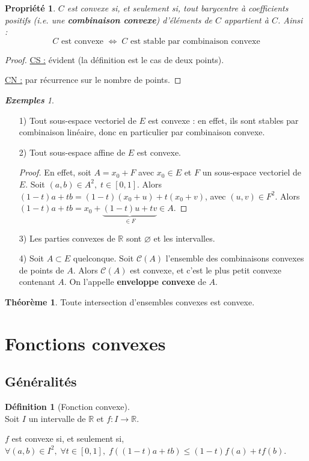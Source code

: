 \documentclass[12pt]{book}
\let\ensembleNombre\mathbb
\newcommand*\R{\ensuremath{\ensembleNombre{R}}}
\newtheorem*{prop}{Propriété}
\theoremstyle{definition}
\newtheorem*{defi}{Définition}
\newtheorem{thme}{Théorème}[chapter]
\theoremstyle{remark}
\newtheorem*{exs}{\textbf{Exemples}}
\newenvironment{fdef}
  {\begin{mdframed}[roundcorner=10pt, linewidth=1pt]\begin{defi}}
  {\end{defi}\end{mdframed}}
\newenvironment{fthme}
  {\begin{mdframed}[roundcorner=10pt, linewidth=2pt]\begin{thme}}
  {\end{thme}\end{mdframed}}
\begin{document}
	\begin{prop}
	$C$ est convexe si, et seulement si, tout barycentre à coefficients positifs (i.e. une \textbf{combinaison convexe}) d'éléments de $C$ appartient à $C$. Ainsi :
	\[ C \text{ est convexe } \Longleftrightarrow \;C \text{ est stable par combinaison convexe} \]
	\end{prop}
	\begin{proof}
	\underline{CS :} évident (la définition est le cas de deux points).
	
	\underline{CN :} par récurrence sur le nombre de points.
	\end{proof}
	
	\begin{exs}\mbox{~}\\
	\begin{itemize}
	\item[1)] Tout sous-espace vectoriel de $E$ est convexe : en effet, ils sont stables par combinaison linéaire, donc en particulier par combinaison convexe.
	\item[2)] Tout sous-espace affine de $E$ est convexe.
				\begin{proof}
				En effet, soit $A = x_0 + F$ avec $x_0 \in E$ et $F$ un sous-espace vectoriel de $E$. Soit $(a,b) \in A^2,\; t \in [0,1]$. Alors $(1-t)a + tb = (1-t)(x_0 + u) + t(x_0 + v)$, avec $(u,v) \in F^2$. Alors $(1-t)a + tb = x_0 + \underbrace{(1-t)u + tv}_{\in F} \in A$.
				\end{proof}
	\item[3)] Les parties convexes de $\R$ sont $\varnothing$ et les intervalles.
	\item[4)] Soit $A \subset E$ quelconque. Soit $\mathcal C(A)$ l'ensemble des combinaisons convexes de points de $A$. Alors $\mathcal C(A)$ est convexe, et c'est le plus petit convexe contenant $A$. On l'appelle \textbf{enveloppe convexe} de $A$.
	\end{itemize}
	\end{exs}
	
	\begin{fthme}
	Toute intersection d'ensembles convexes est convexe.
	\end{fthme}
	
	\section{Fonctions convexes}
		\subsection{Généralités}
	\begin{fdef}[Fonction convexe] \mbox{~}\\
	Soit $I$ un intervalle de $\R$ et $f : I \longrightarrow \R$.
	
	\noindent $f$ est convexe si, et seulement si, $\forall (a,b)\in I^2,\; \forall t \in [0,1],\; f((1-t)a + tb) \leq (1-t)f(a) + tf(b)$.
	\end{fdef}
	
\end{document}
